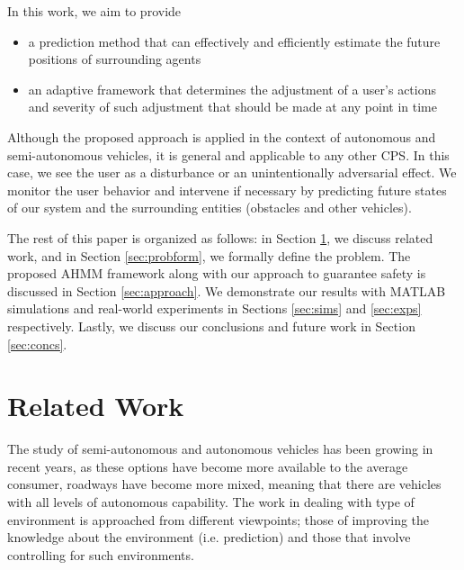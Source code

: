 \documentclass[letterpaper, 10 pt, conference]{ieeeconf}  %
\begin{document}
     In this work, we aim to provide
    \begin{itemize}
    \item{a prediction method that can effectively and efficiently estimate the future positions of surrounding agents}
    \item{an adaptive framework that determines the adjustment of a user's actions and severity of such adjustment that should be made at any point in time}
    \end{itemize}
  
   Although the proposed approach is applied in the context of autonomous and semi-autonomous vehicles, it is general and applicable to any other CPS. In this case, we see the user as a disturbance or an unintentionally adversarial effect. We monitor the user behavior and intervene if necessary by predicting future states of our system and the surrounding entities (obstacles and other vehicles).    
    
    The rest of this paper is organized as follows: in Section \ref{sec:relatedwork}, we discuss related work, and in Section \ref{sec:probform}, we formally define the problem. The proposed AHMM framework along with our approach to guarantee safety is discussed in Section \ref{sec:approach}. We demonstrate our results with MATLAB simulations and real-world experiments in Sections \ref{sec:sims} and \ref{sec:exps} respectively. Lastly, we discuss our conclusions and future work in Section \ref{sec:concs}.

    

\section{Related Work} \label{sec:relatedwork}

The study of semi-autonomous and autonomous vehicles has been growing in recent years, as these options have become more available to the average consumer, roadways have become more mixed, meaning that there are vehicles with all levels of autonomous capability. The work in dealing with type of environment is approached from different viewpoints; those of improving the knowledge about the environment (i.e. prediction) and those that involve controlling for such environments.
\end{document}
